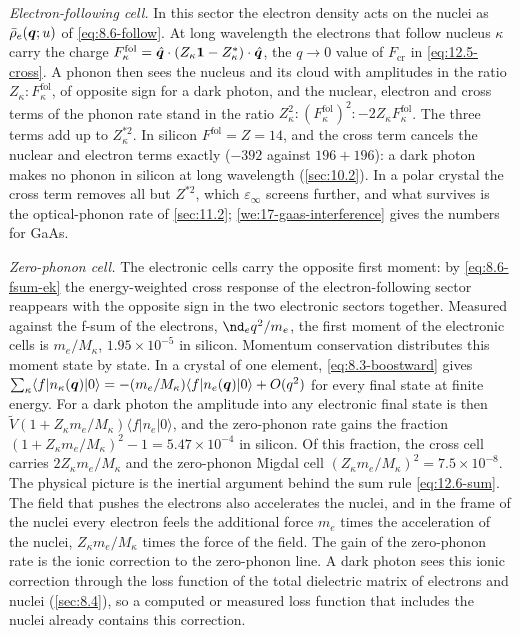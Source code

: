 \emph{Electron-following cell.} In this sector the electron density acts on the nuclei as $\bar\rho_e(\bm{q};u)$ of \cref{eq:8.6-follow}. At long wavelength the electrons that follow nucleus $\kappa$ carry the charge $F^{\mathrm{fol}}_\kappa = \hat{\bm{q}}\cdot(Z_\kappa\mathbf{1} - Z^*_\kappa)\cdot\hat{\bm{q}}$, the $q \to 0$ value of $F_{\mathrm{cr}}$ in \cref{eq:12.5-cross}. A phonon then sees the nucleus and its cloud with amplitudes in the ratio $Z_\kappa : F^{\mathrm{fol}}_\kappa$, of opposite sign for a dark photon, and the nuclear, electron and cross terms of the phonon rate stand in the ratio $Z_\kappa^2 : (F^{\mathrm{fol}}_\kappa)^2 : -2Z_\kappa F^{\mathrm{fol}}_\kappa$. The three terms add up to $Z_\kappa^{*2}$. In silicon $F^{\mathrm{fol}} = Z = 14$, and the cross term cancels the nuclear and electron terms exactly ($-392$ against $196 + 196$): a dark photon makes no phonon in silicon at long wavelength (\cref{sec:10.2}). In a polar crystal the cross term removes all but $Z^{*2}$, which $\varepsilon_\infty$ screens further, and what survives is the optical-phonon rate of \cref{sec:11.2}; \cref{we:17-gaas-interference} gives the numbers for GaAs.

\emph{Zero-phonon cell.} The electronic cells carry the opposite first moment: by \cref{eq:8.6-fsum-ek} the energy-weighted cross response of the electron-following sector reappears with the opposite sign in the two electronic sectors together. Measured against the f-sum of the electrons, $\nd_eq^2/m_e$, the first moment of the electronic cells is $m_e/M_\kappa$, $1.95\times10^{-5}$ in silicon. Momentum conservation distributes this moment state by state. In a crystal of one element, \cref{eq:8.3-boostward} gives $\sum_\kappa\langle f|n_\kappa(\bm{q})|0\rangle = -(m_e/M_\kappa)\langle f|n_e(\bm{q})|0\rangle + O(q^2)$ for every final state at finite energy. For a dark photon the amplitude into any electronic final state is then $\tilde V(1 + Z_\kappa m_e/M_\kappa)\langle f|n_e|0\rangle$, and the zero-phonon rate gains the fraction $(1 + Z_\kappa m_e/M_\kappa)^2 - 1 = 5.47\times10^{-4}$ in silicon. Of this fraction, the cross cell carries $2Z_\kappa m_e/M_\kappa$ and the zero-phonon Migdal cell $(Z_\kappa m_e/M_\kappa)^2 = 7.5\times10^{-8}$. The physical picture is the inertial argument behind the sum rule \cref{eq:12.6-sum}. The field that pushes the electrons also accelerates the nuclei, and in the frame of the nuclei every electron feels the additional force $m_e$ times the acceleration of the nuclei, $Z_\kappa m_e/M_\kappa$ times the force of the field. The gain of the zero-phonon rate is the ionic correction to the zero-phonon line. A dark photon sees this ionic correction through the loss function of the total dielectric matrix of electrons and nuclei (\cref{sec:8.4}), so a computed or measured loss function that includes the nuclei already contains this correction.


